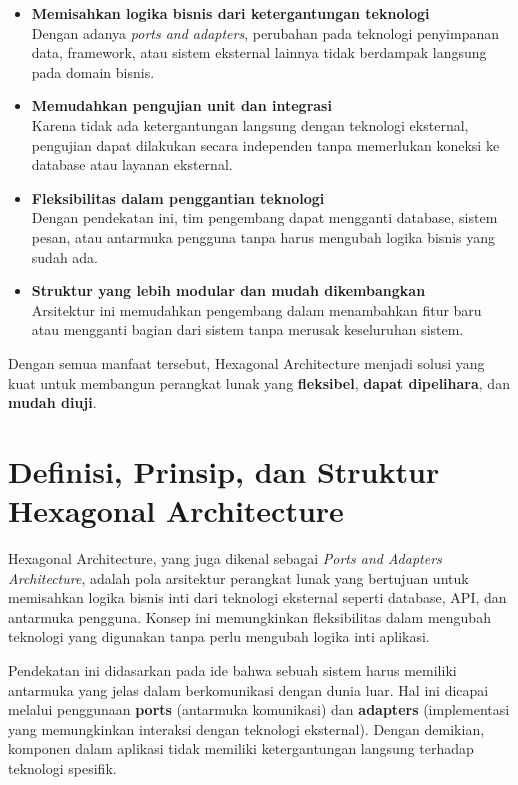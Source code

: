 \begin{itemize}
	\item \textbf{Memisahkan logika bisnis dari ketergantungan teknologi} \\
	Dengan adanya \textit{ports and adapters}, perubahan pada teknologi penyimpanan data, framework, atau sistem eksternal lainnya tidak berdampak langsung pada domain bisnis.
	
	\item \textbf{Memudahkan pengujian unit dan integrasi} \\
	Karena tidak ada ketergantungan langsung dengan teknologi eksternal, pengujian dapat dilakukan secara independen tanpa memerlukan koneksi ke database atau layanan eksternal.
	
	\item \textbf{Fleksibilitas dalam penggantian teknologi} \\
	Dengan pendekatan ini, tim pengembang dapat mengganti database, sistem pesan, atau antarmuka pengguna tanpa harus mengubah logika bisnis yang sudah ada.
	
	\item \textbf{Struktur yang lebih modular dan mudah dikembangkan} \\
	Arsitektur ini memudahkan pengembang dalam menambahkan fitur baru atau mengganti bagian dari sistem tanpa merusak keseluruhan sistem.
\end{itemize}

Dengan semua manfaat tersebut, Hexagonal Architecture menjadi solusi yang kuat untuk membangun perangkat lunak yang \textbf{fleksibel}, \textbf{dapat dipelihara}, dan \textbf{mudah diuji}.


\section{Definisi, Prinsip, dan Struktur Hexagonal Architecture}

Hexagonal Architecture, yang juga dikenal sebagai \textit{Ports and Adapters Architecture}, adalah pola arsitektur perangkat lunak yang bertujuan untuk memisahkan logika bisnis inti dari teknologi eksternal seperti database, API, dan antarmuka pengguna. Konsep ini memungkinkan fleksibilitas dalam mengubah teknologi yang digunakan tanpa perlu mengubah logika inti aplikasi.

Pendekatan ini didasarkan pada ide bahwa sebuah sistem harus memiliki antarmuka yang jelas dalam berkomunikasi dengan dunia luar. Hal ini dicapai melalui penggunaan \textbf{ports} (antarmuka komunikasi) dan \textbf{adapters} (implementasi yang memungkinkan interaksi dengan teknologi eksternal). Dengan demikian, komponen dalam aplikasi tidak memiliki ketergantungan langsung terhadap teknologi spesifik.

